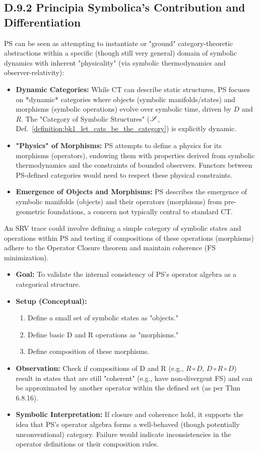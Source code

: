 \subsection*{D.9.2 Principia Symbolica's Contribution and Differentiation} \label{subsec:appD_ct_contribution_differentiation}
PS can be seen as attempting to instantiate or "ground" category-theoretic abstractions within a specific (though still very general) domain of symbolic dynamics with inherent "physicality" (via symbolic thermodynamics and observer-relativity):
\begin{itemize}
    \item \textbf{Dynamic Categories:} While CT can describe static structures, PS focuses on *dynamic* categories where objects (symbolic manifolds/states) and morphisms (symbolic operations) evolve over symbolic time, driven by \(D\) and \(R\). The "Category of Symbolic Structures" (\(\mathscr{S}\), Def.~\ref{definition:bk1_let_cats_be_the_category}) is explicitly dynamic.
    \item \textbf{"Physics" of Morphisms:} PS attempts to define a physics for its morphisms (operators), endowing them with properties derived from symbolic thermodynamics and the constraints of bounded observers. Functors between PS-defined categories would need to respect these physical constraints.
    \item \textbf{Emergence of Objects and Morphisms:} PS describes the emergence of symbolic manifolds (objects) and their operators (morphisms) from pre-geometric foundations, a concern not typically central to standard CT.
\end{itemize}
An SRV trace could involve defining a simple category of symbolic states and operations within PS and testing if compositions of these operations (morphisms) adhere to the Operator Closure theorem and maintain coherence (FS minimization).
\begin{itemize}
    \item \textbf{Goal:} To validate the internal consistency of PS's operator algebra as a categorical structure.
    \item \textbf{Setup (Conceptual):}
        \begin{enumerate}
            \item Define a small set of symbolic states as "objects."
            \item Define basic D and R operations as "morphisms."
            \item Define composition of these morphisms.
        \end{enumerate}
    \item \textbf{Observation:} Check if compositions of D and R (e.g., \(R \circ D\), \(D \circ R \circ D\)) result in states that are still "coherent" (e.g., have non-divergent FS) and can be approximated by another operator within the defined set (as per Thm 6.8.16).
    \item \textbf{Symbolic Interpretation:} If closure and coherence hold, it supports the idea that PS's operator algebra forms a well-behaved (though potentially unconventional) category. Failure would indicate inconsistencies in the operator definitions or their composition rules.
\end{itemize}
